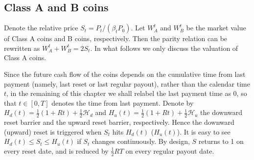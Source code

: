 \documentclass[draft, noinfoline]{ectaart}
\numberwithin{equation}{section}
\theoremstyle{plain}
\begin{document}
\subsection{Class A and B coins}

Denote the relative price $S_t=P_t/(\beta_t P_0)$. Let $W^t_{A}$ and $W^t_{B}$ be the market value of Class A coins and B coins, respectively. Then the parity relation can be rewritten as $W_A^t +W_B^t=2S_t$. In what follows  we only discuss the valuation of Class A coins.

Since the future cash flow of the coins depends on the cumulative time from last payment (namely, last reset or last regular payout), rather than the calendar time $t$, in the remaining of this chapter we shall relabel the last payment time as 0, so that $t\in [0, T]$ denotes the time from last payment. Denote by $H_{d}(t)=\frac{1}{2}(1+Rt)+\frac{1}{2}\mathcal{H}_{d}$ and $H_{u}(t)=\frac{1}{2}(1+Rt)+\frac{1}{2}\mathcal{H}_{u}$ the downward reset barrier and the upward reset barrier, respectively. Hence the downward (upward) reset is triggered when $S_t$ hits $H_d(t)$ ($H_u(t)$). It is easy to see $H_{d}(t)\le S_t \le H_{u}(t)$ if $S_t$ changes continuously. By design, $S$ returns to 1 on every reset date, and is reduced by $\frac{1}{2}RT$ on every regular payout date.
\end{document}
